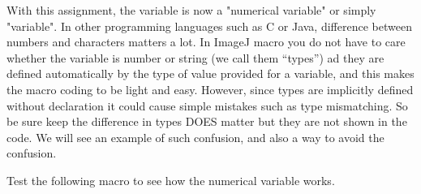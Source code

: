 With this assignment, the variable is now a "numerical variable" or simply "variable". 
In other programming languages such as C or Java, difference between numbers and characters matters a lot. 
In ImageJ macro you do not have to care whether the variable is number or string (we call them ``types'') ad they are defined automatically by the type of value provided for a variable, and this makes the macro coding to be light and easy. However, since types are implicitly defined without declaration it could cause simple mistakes such as type mismatching. 
So be sure keep the difference in types DOES matter but they are not shown in the code. We will see an example of such confusion, 
and also a way to avoid the confusion.

Test the following macro to see how the numerical variable works.